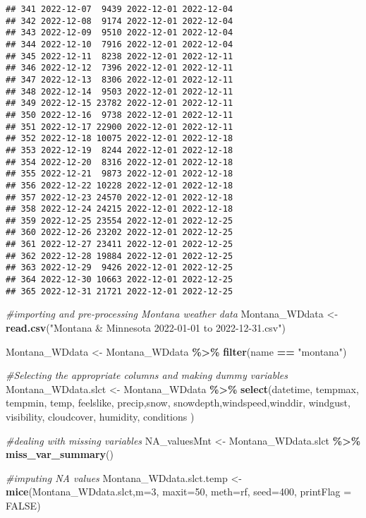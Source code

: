 \documentclass[
]{article}
\newenvironment{Shaded}{\begin{snugshade}}{\end{snugshade}}
\newcommand{\AttributeTok}[1]{\textcolor[rgb]{0.13,0.29,0.53}{#1}}
\newcommand{\CommentTok}[1]{\textcolor[rgb]{0.56,0.35,0.01}{\textit{#1}}}
\newcommand{\ConstantTok}[1]{\textcolor[rgb]{0.56,0.35,0.01}{#1}}
\newcommand{\DecValTok}[1]{\textcolor[rgb]{0.00,0.00,0.81}{#1}}
\newcommand{\FunctionTok}[1]{\textcolor[rgb]{0.13,0.29,0.53}{\textbf{#1}}}
\newcommand{\NormalTok}[1]{#1}
\newcommand{\OtherTok}[1]{\textcolor[rgb]{0.56,0.35,0.01}{#1}}
\newcommand{\SpecialCharTok}[1]{\textcolor[rgb]{0.81,0.36,0.00}{\textbf{#1}}}
\newcommand{\StringTok}[1]{\textcolor[rgb]{0.31,0.60,0.02}{#1}}
\begin{document}
\begin{verbatim}
## 341 2022-12-07  9439 2022-12-01 2022-12-04
## 342 2022-12-08  9174 2022-12-01 2022-12-04
## 343 2022-12-09  9510 2022-12-01 2022-12-04
## 344 2022-12-10  7916 2022-12-01 2022-12-04
## 345 2022-12-11  8238 2022-12-01 2022-12-11
## 346 2022-12-12  7396 2022-12-01 2022-12-11
## 347 2022-12-13  8306 2022-12-01 2022-12-11
## 348 2022-12-14  9503 2022-12-01 2022-12-11
## 349 2022-12-15 23782 2022-12-01 2022-12-11
## 350 2022-12-16  9738 2022-12-01 2022-12-11
## 351 2022-12-17 22900 2022-12-01 2022-12-11
## 352 2022-12-18 10075 2022-12-01 2022-12-18
## 353 2022-12-19  8244 2022-12-01 2022-12-18
## 354 2022-12-20  8316 2022-12-01 2022-12-18
## 355 2022-12-21  9873 2022-12-01 2022-12-18
## 356 2022-12-22 10228 2022-12-01 2022-12-18
## 357 2022-12-23 24570 2022-12-01 2022-12-18
## 358 2022-12-24 24215 2022-12-01 2022-12-18
## 359 2022-12-25 23554 2022-12-01 2022-12-25
## 360 2022-12-26 23202 2022-12-01 2022-12-25
## 361 2022-12-27 23411 2022-12-01 2022-12-25
## 362 2022-12-28 19884 2022-12-01 2022-12-25
## 363 2022-12-29  9426 2022-12-01 2022-12-25
## 364 2022-12-30 10663 2022-12-01 2022-12-25
## 365 2022-12-31 21721 2022-12-01 2022-12-25
\end{verbatim}

\begin{Shaded}
\begin{Highlighting}[]
\CommentTok{\#importing and pre{-}processing Montana weather data }
\NormalTok{Montana\_WDdata }\OtherTok{\textless{}{-}} \FunctionTok{read.csv}\NormalTok{(}\StringTok{"Montana \& Minnesota 2022{-}01{-}01 to 2022{-}12{-}31.csv"}\NormalTok{)}

\NormalTok{Montana\_WDdata }\OtherTok{\textless{}{-}}\NormalTok{  Montana\_WDdata }\SpecialCharTok{\%\textgreater{}\%}
  \FunctionTok{filter}\NormalTok{(name }\SpecialCharTok{==} \StringTok{"montana"}\NormalTok{)}

\CommentTok{\#Selecting the appropriate columns and making dummy variables }
\NormalTok{Montana\_WDdata.slct }\OtherTok{\textless{}{-}}\NormalTok{ Montana\_WDdata }\SpecialCharTok{\%\textgreater{}\%}
  \FunctionTok{select}\NormalTok{(datetime, tempmax, tempmin, temp, }
\NormalTok{          feelslike, precip,snow, snowdepth,windspeed,winddir, }
\NormalTok{          windgust, visibility, cloudcover, humidity, conditions )}

\CommentTok{\#dealing with missing variables}
\NormalTok{NA\_valuesMnt }\OtherTok{\textless{}{-}}\NormalTok{ Montana\_WDdata.slct }\SpecialCharTok{\%\textgreater{}\%}
  \FunctionTok{miss\_var\_summary}\NormalTok{()}

\CommentTok{\#imputing NA values}
\NormalTok{Montana\_WDdata.slct.temp }\OtherTok{\textless{}{-}} \FunctionTok{mice}\NormalTok{(Montana\_WDdata.slct,}\AttributeTok{m=}\DecValTok{3}\NormalTok{, }
                                 \AttributeTok{maxit=}\DecValTok{50}\NormalTok{, }
                                 \AttributeTok{meth=}\StringTok{\textquotesingle{}rf\textquotesingle{}}\NormalTok{, }
                                 \AttributeTok{seed=}\DecValTok{400}\NormalTok{, }
                                 \AttributeTok{printFlag =} \ConstantTok{FALSE}\NormalTok{)}
\end{Highlighting}
\end{Shaded}
\end{document}
